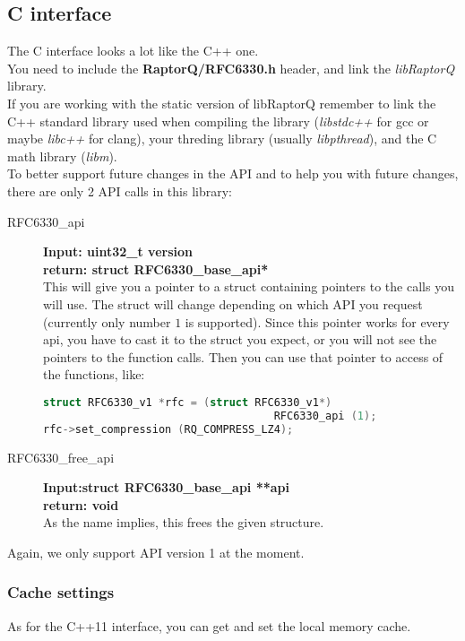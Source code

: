 \documentclass[11pt,a4paper]{refart}
\begin{document}
\subsection{C interface}
The C interface looks a lot like the C++ one.\\
You need to include the \textbf{RaptorQ/RFC6330.h} header, and link the \textit{libRaptorQ} library.\\
If you are working with the static version of libRaptorQ remember to link the C++ standard library used when
compiling the library (\textit{libstdc++} for gcc or maybe \textit{libc++} for clang), your threding library (usually \textit{libpthread}), and the C math library (\textit{libm}).\\

 To better support future changes in the API and to help you with future changes,
there are only 2 API calls in this library:
\begin{description}
\item[RFC6330\_api] \textbf{Input: uint32\_t version}\\
\textbf{return: struct RFC6330\_base\_api*}\\
This will give you a pointer to a struct containing pointers to the calls you will use.
The struct will change depending on which API you request (currently only number $1$ is supported).
Since this pointer works for every api, you have to cast it to the struct you expect, or you will not see
the pointers to the function calls. Then you can use that pointer to access of the functions, like:
\begin{lstlisting}[language=C]
struct RFC6330_v1 *rfc = (struct RFC6330_v1*)
									RFC6330_api (1);
rfc->set_compression (RQ_COMPRESS_LZ4);
\end{lstlisting}
\item[RFC6330\_free\_api] \textbf{Input:struct RFC6330\_base\_api **api}\\
\textbf{return: void}\\
As the name implies, this frees the given structure.
\end{description}

Again, we only support API version 1 at the moment.

\subsubsection{Cache settings}
As for the C++11 interface, you can get and set the local memory cache.
\end{document}
